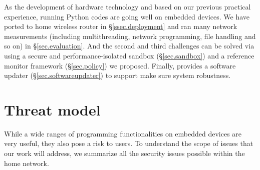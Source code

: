 As the development of hardware technology and based on our previous practical experience, running Python codes are going well on embedded devices. We have ported \sysname to home wireless router in \S{\ref{ssec.deployment}} and ran many network measurements (including multithreading, network programming, file handling and so on) in \S{\ref{sec.evaluation}}. And the second and third challenges can be solved via using a secure and performance-isolated sandbox (\S{\ref{sec.sandbox}}) and a reference monitor framework  (\S{\ref{sec.policy}}) we proposed. Finally, \sysname provides a software updater (\S{\ref{sec.softwareupdater}}) to support make sure system robustness.

\section{Threat model}
\label{ssec.threat_models}
While a wide ranges of programming functionalities on embedded devices are very useful, they also pose a risk to users. To understand the scope of issues that our work will address, we summarize all the security issues possible within the home network.

